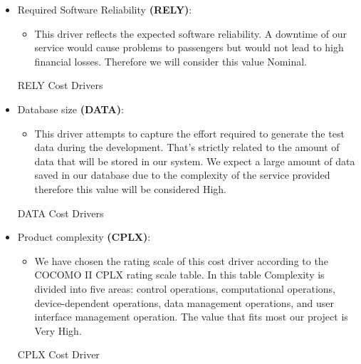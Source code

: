 \begin{itemize}
	\item Required Software Reliability \textbf{(RELY)}:
	\begin{itemize}
	\item[] This driver reflects the expected software reliability. A downtime of our service would cause problems to passengers but would not lead to high financial losses. Therefore we will consider this value \textsf{Nominal}.
\end{itemize}
\begin{costdriverstable}{RELY Cost Drivers}
	\hline
\end{costdriverstable}
\end{itemize}

\begin{itemize}
	\item Database size \textbf{(DATA)}:
	\begin{itemize}
	\item[] This driver attempts to capture the effort required to generate the test data during the development. That's strictly related to the amount of data that will be stored in our system. We expect a large amount of data saved in our database due to the complexity of the service provided therefore this value will be considered \textsf{High}.
\end{itemize}
\begin{costdriverstable}{DATA Cost Drivers}
	\hline
\end{costdriverstable}
\end{itemize}


\begin{itemize}
	\item Product complexity \textbf{(CPLX)}:
	\begin{itemize}
	\item[] We have chosen the rating scale of this cost driver according to the COCOMO II CPLX rating scale table.
In this table Complexity is divided into five areas: control operations, computational operations, device-dependent operations, data management operations, and user interface management operation. The value that fits most our project is \textsf{Very High}.
\newpage
\end{itemize}
\begin{costdriverstable}{CPLX Cost Driver}
\end{costdriverstable}
\end{itemize}

